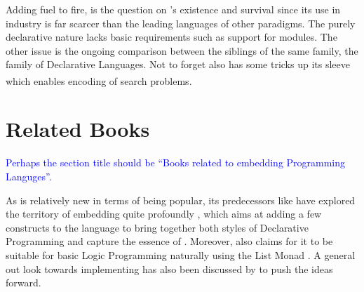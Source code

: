 \documentclass[thesis-solanki.tex]{subfiles}
\begin{document}
Adding fuel to fire, is the question on 's existence and survival
\cite{website:prolog-killer,website:prolog-steam,website:prolog-death,somogyi1995logic} since its use in industry
is far scarcer
than the leading languages of other paradigms.
The purely declarative nature lacks basic requirements such as support for modules.
The other issue is the ongoing comparison between the siblings \cite{website:haskell-choice} of the same family, the
family of Declarative Languages.
Not to forget  also has some tricks \cite{website:logic-programming-haskell} up its sleeve which
enables encoding of search problems.\textsuperscript{\,}

\section{Related Books}
\textcolor{blue}{Perhaps the section title should be ``Books related to embedding Programming Languges''.}

As  is relatively new in terms of being popular, its predecessors like
 have
explored the territory of embedding  quite profoundly \cite{friedman05reasoned}, which aims at adding a few
constructs to the language to bring together both styles of Declarative Programming and capture the essence of
.
Moreover,  also claims for it to be suitable for basic Logic Programming naturally using the List
Monad \cite{website:logicprogexamplehaskell}.
A general out look towards implementing  has also been discussed by
\cite{krishnamurthi2007programming} to push the ideas forward.
\end{document}
